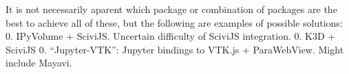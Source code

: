 It is not necessarily aparent which package or combination of packages
are the best to achieve all of these, but the following are examples of
possible solutions: 0. IPyVolume + SciviJS. Uncertain difficulty of
SciviJS integration. 0. K3D + SciviJS 0. ``Jupyter-VTK'': Jupyter
bindings to VTK.js + ParaWebView. Might include Mayavi.
